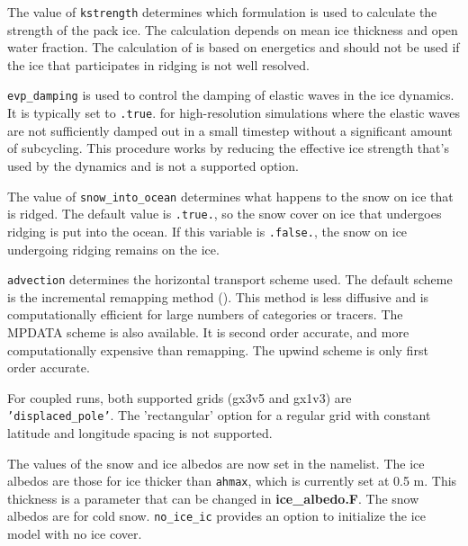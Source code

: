 The value of {\tt kstrength} determines which formulation is used to
calculate the strength of the pack ice.  The \cite{hibl79} calculation
depends on mean ice thickness and open water fraction.  The calculation
of \cite{roth75b} is based on energetics and should not be used if the
ice that participates in ridging is not well resolved.  

{\tt evp\_damping} is used to control the damping of elastic waves in
the ice dynamics.  It is typically set to {\tt .true}. for high-resolution
simulations where the elastic waves are not sufficiently damped out in a
small timestep without a significant amount of subcycling.  This procedure
works by reducing the effective ice strength that's used by the dynamics
and is not a supported option.

The value of {\tt snow\_into\_ocean} determines what happens to the snow
on ice that is ridged.  The default value is {\tt .true.}, so the snow cover
on ice that undergoes ridging is put into the ocean.  If this variable is
{\tt .false.}, the snow on ice undergoing ridging remains on the ice.

{\tt advection} determines the horizontal transport scheme used. The default
scheme is the incremental remapping method (\cite{lipshunke04}).  This method
is less diffusive and is computationally efficient for large numbers of categories
or tracers.  The MPDATA scheme is also available.  It is second order accurate,
and more computationally expensive than remapping. The upwind scheme is only first
order accurate.
 
For coupled runs, both supported grids (gx3v5 and gx1v3) are {\tt 'displaced\_pole'}.
The 'rectangular' option for a regular grid with constant 
latitude and longitude spacing is not supported.

The values of the snow and ice albedos are now set in the namelist.  The ice albedos
are those for ice thicker than {\tt ahmax}, which is currently set at 0.5 m.  This
thickness is a parameter that can be changed in {\bf ice\_albedo.F}. The snow albedos
are for cold snow.  {\tt no\_ice\_ic} provides an option to initialize the ice model
with no ice cover.


